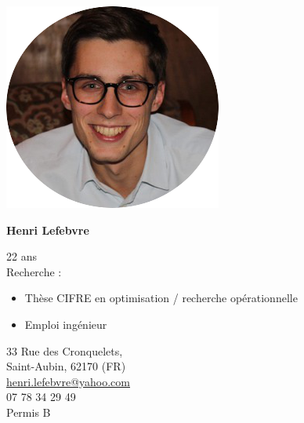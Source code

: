 \documentclass[11.5pt]{article}
\newlength\cvPhotoWidth
\newlength\cvHspacePhotoTitle
\newlength\cvNameWidth
\newlength\cvAddressWidth
\begin{document}
    \begin{minipage}[t]{\textwidth}
        \begin{minipage}{\cvPhotoWidth}
            \includegraphics[width=\textwidth]{src/profile.png}
        \end{minipage}
        \hspace{\cvHspacePhotoTitle}
            \begin{minipage}[t]{\textwidth-\cvPhotoWidth-\cvHspacePhotoTitle}
            \begin{minipage}{\cvNameWidth}
            \begin{Huge}
                \textbf{Henri Lefebvre}
            \end{Huge}
            22 ans\\
            Recherche :
            \begin{itemize}
              \item Thèse CIFRE en optimisation / recherche opérationnelle
              \item Emploi ingénieur
            \end{itemize}
            \end{minipage}
            \begin{minipage}{\cvAddressWidth}
                \begin{flushright}
                    33 Rue des Cronquelets, \\
                    Saint-Aubin, 62170 (FR)\\
                    \underline{henri.lefebvre@yahoo.com}\\
                    07 78 34 29 49\\
                    Permis B
                \end{flushright}
            \end{minipage}
        \end{minipage}
    \end{minipage}
\end{document}
